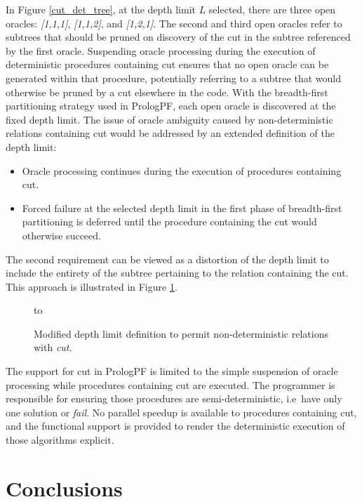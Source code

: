 In Figure \ref{cut_det_tree}, at the depth limit $L$ selected, there are three open
oracles: \textit{[1,1,1]},
\textit{[1,1,2]}, and \textit{[1,2,1]}.  The second and third open oracles refer to subtrees that should
be pruned on discovery of the cut in the subtree referenced by the
first oracle.  Suspending oracle processing during the execution of
deterministic procedures containing cut ensures that no open oracle
can be generated within that procedure, potentially referring to a
subtree that would otherwise be pruned by a cut elsewhere in the code.
With the breadth-first partitioning strategy used in PrologPF, each
open oracle is discovered at the fixed depth limit.  The issue of
oracle ambiguity caused by non-deterministic relations containing cut
would be addressed by an extended definition of the depth limit:
\begin{itemize}
\item{Oracle processing continues during the execution of procedures containing cut.}
\item{Forced failure at the selected depth limit in the first phase of breadth-first partitioning
  is deferred until the procedure containing the cut would otherwise succeed.}
\end{itemize}
The second requirement can be viewed as a distortion of the depth limit to include the
entirety of the subtree pertaining to the relation containing the cut.
This approach is illustrated in Figure \ref{cut_det_tree4}.

\begin{figure}[htb]
\vspace{5mm} \hbox to 
\caption{Modified depth limit definition to permit non-deterministic relations with \textit{cut}.}
\vspace{5mm}
\label{cut_det_tree4}
\end{figure}

The support for cut in PrologPF is limited to the simple suspension of oracle processing
while procedures containing cut are executed.  The programmer is responsible for ensuring
those procedures are semi-deterministic, i.e\ have only one solution or \textit{fail}.
No parallel speedup is available
to procedures containing cut, and the functional support is provided to render the
deterministic execution of those algorithms explicit.

\section{Conclusions} %

